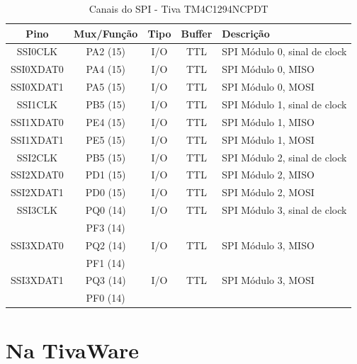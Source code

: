 \begin{table}[H]
	\centering
	\caption{Canais do SPI - Tiva TM4C1294NCPDT \cite{DATASHEET_TIVA} }
	\label{tab:CanaisSPI}
	\begin{tabular}{|c|c|c|c|l|}
		\rowcolor[HTML]{000000} 
		{\color[HTML]{FFFFFF} Pino}  & {\color[HTML]{FFFFFF} Mux/Função} & {\color[HTML]{FFFFFF} Tipo} & {\color[HTML]{FFFFFF} Buffer} & {\color[HTML]{FFFFFF} Descrição}  \\
		\hline
		SSI0CLK   & PA2 (15) & I/O & TTL & SPI Módulo 0, sinal de clock   \\
		\hline
		SSI0XDAT0 & PA4 (15) & I/O & TTL & SPI Módulo 0, MISO \\
		\hline
		SSI0XDAT1 & PA5 (15) & I/O & TTL & SPI Módulo 0, MOSI \\
		\hline
		SSI1CLK   & PB5 (15) & I/O & TTL & SPI Módulo 1, sinal de clock   \\
		\hline
		SSI1XDAT0 & PE4 (15) & I/O & TTL & SPI Módulo 1, MISO  \\
		\hline
		SSI1XDAT1 & PE5 (15) & I/O & TTL & SPI Módulo 1, MOSI  \\
		\hline
		SSI2CLK   & PB5 (15) & I/O & TTL & SPI Módulo 2, sinal de clock   \\
		\hline
		SSI2XDAT0 & PD1 (15) & I/O & TTL & SPI Módulo 2, MISO  \\
		\hline
		SSI2XDAT1 & PD0 (15) & I/O & TTL & SPI Módulo 2, MOSI  \\
		\hline
		SSI3CLK   & PQ0 (14) & I/O & TTL & SPI Módulo 3, sinal de clock   \\
		          & PF3 (14) &     &     &                                \\
		\hline
		SSI3XDAT0 & PQ2 (14) & I/O & TTL & SPI Módulo 3, MISO  \\
		          & PF1 (14) &     &     &                     \\
		\hline
		SSI3XDAT1 & PQ3 (14) & I/O & TTL & SPI Módulo 3, MOSI  \\
		          & PF0 (14) &     &     &                     \\
		\hline
	\end{tabular}
\end{table}


\section{Na TivaWare}